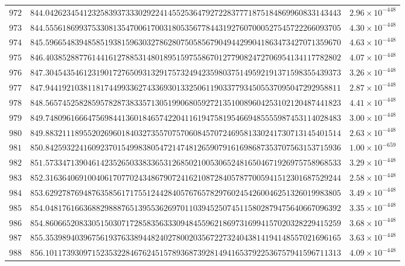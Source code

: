 \documentclass[12pt,reqno]{amsart}
\theoremstyle{remark}
\begin{document}
\begin{longtable}{clc}
$972$ & $844.0426234541232583937333029224145525364792722837771875184869960833143443$ & $2.96\times 10^{-448}$ \\
$973$ & $844.5556186993753308135470061700318053567784431927607000527545722266093705$ & $4.30\times 10^{-448}$ \\
$974$ & $845.5966548394858519381596303278628075058567904944299041863473427071359670$ & $4.63\times 10^{-448}$ \\
$975$ & $846.4038528877614416127885314801895159755867012779082472706954134117782802$ & $4.07\times 10^{-448}$ \\
$976$ & $847.3045435461231901727650931329175732494235980375149592191371598355439373$ & $3.26\times 10^{-448}$ \\
$977$ & $847.9441921038118174499336274336930133250611903377934505537095047292958811$ & $2.87\times 10^{-448}$ \\
$978$ & $848.5657452582859578287383357130519906805927213510089604253102120487441823$ & $4.41\times 10^{-448}$ \\
$979$ & $849.7480961666475698441360184657422041161947581954669485555987453114028483$ & $3.00\times 10^{-448}$ \\
$980$ & $849.8832111895520269601840327355707570608457072469581330241730713145401514$ & $2.63\times 10^{-448}$ \\
$981$ & $850.8425932241609237015499838054721474812659079161698687353707563153715936$ & $1.00\times 10^{-659}$ \\
$982$ & $851.5733471390461423526503383365312685021005306524816504671926975758968533$ & $3.29\times 10^{-448}$ \\
$983$ & $852.3163640691004061707702434867907241621087284057877005941512301687529244$ & $2.58\times 10^{-448}$ \\
$984$ & $853.6292787694876358561717551244284057676578297602454260046251326019983805$ & $3.49\times 10^{-448}$ \\
$985$ & $854.0481761663688298887651395536269701103945250745115802879475640667096392$ & $3.35\times 10^{-448}$ \\
$986$ & $854.8606652083305150307172858356333094845596218697316994157020328229415259$ & $3.68\times 10^{-448}$ \\
$987$ & $855.3539894039675619376338944824027800203567227324043814194148557021696165$ & $3.63\times 10^{-448}$ \\
$988$ & $856.1011739309715235322846762451578936873928149416537922536757941596711313$ & $4.09\times 10^{-448}$ \\

\end{longtable}
\end{document}

